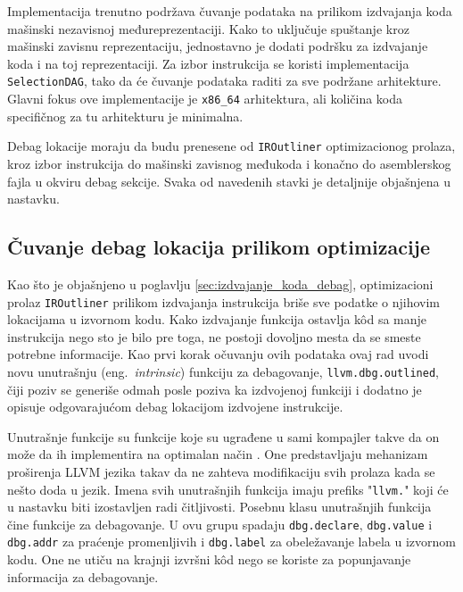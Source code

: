 \documentclass[12pt,oneside]{memoir}
\begin{document}
Implementacija trenutno podržava čuvanje podataka na prilikom izdvajanja koda mašinski nezavisnoj međureprezentaciji.
Kako to uključuje spuštanje kroz mašinski zavisnu reprezentaciju, jednostavno je dodati podršku za izdvajanje koda i na toj reprezentaciji.
Za izbor instrukcija se koristi implementacija \verb|SelectionDAG|, tako da će čuvanje podataka raditi za sve podržane arhitekture.
Glavni fokus ove implementacije je \verb|x86_64| arhitektura, ali količina koda specifičnog za tu arhitekturu je minimalna.

Debag lokacije moraju da budu prenesene od \verb|IROutliner| optimizacionog prolaza, kroz izbor instrukcija do mašinski zavisnog međukoda i konačno do asemblerskog fajla u okviru debag sekcije.
Svaka od navedenih stavki je detaljnije objašnjena u nastavku.

\subsection{Čuvanje debag lokacija prilikom optimizacije}

Kao što je objašnjeno u poglavlju \ref{sec:izdvajanje_koda_debag},
optimizacioni prolaz \verb|IROutliner| prilikom izdvajanja instrukcija briše sve podatke o njihovim lokacijama u izvornom kodu.
Kako izdvajanje funkcija ostavlja k\^od sa manje instrukcija nego sto je bilo pre toga, ne postoji dovoljno mesta da se smeste potrebne informacije.
Kao prvi korak očuvanju ovih podataka ovaj rad uvodi novu unutrašnju (eng.~{\em intrinsic}) funkciju za debagovanje, \verb|llvm.dbg.outlined|, čiji poziv se generiše odmah posle poziva ka izdvojenoj funkciji i dodatno je opisuje odgovarajućom debag lokacijom izdvojene instrukcije.

Unutrašnje funkcije su funkcije koje su ugrađene u sami kompajler takve da on može da ih implementira na optimalan način \cite{sarda2015llvm_essentials}.
One predstavljaju mehanizam proširenja LLVM jezika takav da ne zahteva modifikaciju svih prolaza kada se nešto doda u jezik.
Imena svih unutrašnjih funkcija imaju prefiks "\verb|llvm.|" koji će u nastavku biti izostavljen radi čitljivosti.
Posebnu klasu unutrašnjih funkcija čine funkcije za debagovanje.
U ovu grupu spadaju \verb|dbg.declare|, \verb|dbg.value| i \verb|dbg.addr| za praćenje promenljivih i \verb|dbg.label| za obeležavanje labela u izvornom kodu.
One ne utiču na krajnji izvršni k\^od nego se koriste za popunjavanje informacija za debagovanje.
\end{document}
